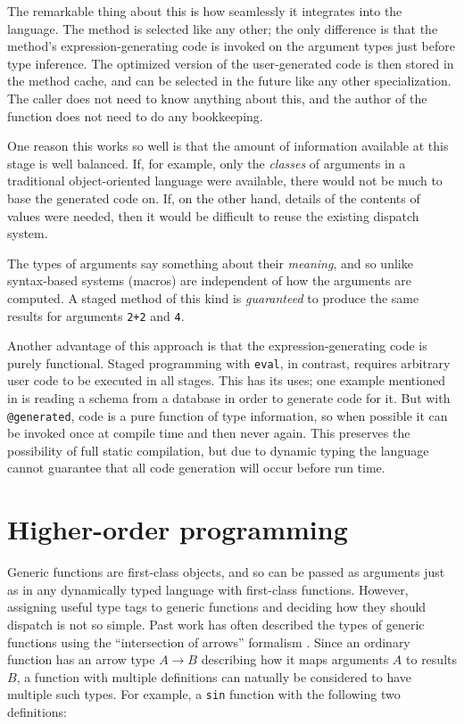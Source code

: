 The remarkable thing about this is how seamlessly it integrates into
the language.
The method is selected like any other; the only difference is that
the method's expression-generating code is invoked on the argument types
just before type inference.
The optimized version of the user-generated code is then stored in the method
cache, and can be selected in the future like any other specialization.
The caller does not need to know anything about this, and the author
of the function does not need to do any bookkeeping.

One reason this works so well is that the amount of information
available at this stage is well balanced.
If, for example, only the \emph{classes} of arguments in a traditional
object-oriented language were available, there would not be much
to base the generated code on.
If, on the other hand, details of the contents of values were needed,
then it would be difficult to reuse the existing dispatch system.

The types of arguments say something about their \emph{meaning},
and so unlike syntax-based systems (macros) are independent of how
the arguments are computed.
A staged method of this kind is \emph{guaranteed} to produce the
same results for arguments \texttt{2+2} and \texttt{4}.

Another advantage of this approach is that the expression-generating
code is purely functional.
Staged programming with \texttt{eval}, in contrast, requires arbitrary
user code to be executed in all stages.
This has its uses; one example mentioned in \cite{DeVito:2014:FRG:2594291.2594307}
is reading a schema from a database in order to generate code for it.
But with \texttt{@generated}, code is a pure function of type information,
so when possible it can be invoked once at compile time and then
never again.
This preserves the possibility of full static compilation, but due to
dynamic typing the language cannot guarantee that all code generation
will occur before run time.



\section{Higher-order programming}

Generic functions are first-class objects, and so can be passed as arguments
just as in any dynamically typed language with first-class functions.
However, assigning useful type tags to generic functions and deciding how
they should dispatch is not so simple.
Past work has often described the types of generic functions using the
``intersection of arrows'' formalism
\cite{RonchiDellaRocca:1988:PTS:55079.55086, Dunfield:2012:EIU:2364527.2364534,
boundedquant, Castagna:1995:COF:203496.203510}.
Since an ordinary function has an arrow type $A\rightarrow B$ describing how it
maps arguments $A$ to results $B$, a function with multiple definitions can
natually be considered to have multiple such types.
For example, a \texttt{sin} function with the following two definitions:

